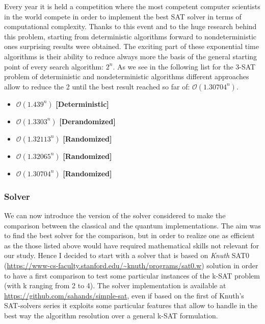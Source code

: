 \documentclass[english]{article}
\begin{document}
			Every year it is held a competition where the most competent computer scientists in the world compete in order to implement the best SAT solver in terms of computational complexity. Thanks to this event and to the huge research behind this problem, starting from deterministic algorithms forward to nondeterministic ones surprising results were obtained. The exciting part of these exponential time algorithms is their ability to reduce always more the basis of the general starting point of every search algorithm: $2^n$. As we see in the following list for the 3-SAT problem of deterministic and nondeterministic algorithms different approaches allow to reduce the 2 until the best result reached so far of: $\mathcal{O}(1.30704^n)$.
			
			\begin{itemize}
				\item	\cite[Kutzkov K., Scheder D.]{KutzkovScheder} $\mathcal{O}(1.439^n)$ \textbf{[Deterministic]}
				
				\item	\cite[Makino K., Tamaki S., Yamamoto M]{MakinoTamakiYamamoto} $\mathcal{O}(1.3303^n)$ \textbf{[Derandomized]}
				
				\item	\cite[Iwama K., Seto K., Takai T., Tamaki S.]{IwamaSetoTakai} $\mathcal{O}(1.32113^n)$ \textbf{[Randomized]}
				
				\item	\cite[Hertli T., Moser R. A., Scheder D.]{HertliMoserScheder} $\mathcal{O}(1.32065^n)$ \textbf{[Randomized]}
				
				\item	\cite[Hertli T.]{Hertli} $\mathcal{O}(1.30704^n)$ \textbf{[Randomized]}
			\end{itemize}
			
			\subsubsection{Solver}
			\label{sec:classicalSolver}
				We can now introduce the version of the solver considered to make the comparison between the classical and the quantum implementations. The aim was to find the best solver for the comparison, but in order to realize one as efficient as the those listed above would have required mathematical skills not relevant for our study. Hence I decided to start with a solver that is based on \emph{Knuth} SAT0 (\url{https://www-cs-faculty.stanford.edu/~knuth/programs/sat0.w}) solution in order to have a first comparison to test some particular instances of the k-SAT problem (with k ranging from 2 to 4). The solver implementation is available at \url{https://github.com/sahands/simple-sat}, even if based on the first of Knuth's SAT-solvers series it exploits some particular features that allow to handle in the best way the algorithm resolution over a general k-SAT formulation. \\
				
\end{document}
